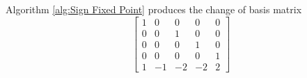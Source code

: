 \documentclass{article}
\theoremstyle{plain}
\theoremstyle{definition}
\newcommand{\tand}{\ensuremath{\,\,\, \text{and} \,\,\,}}
\begin{document}
Algorithm \ref{alg:Sign Fixed Point} produces the change of basis matrix 
$$
 \left[ \begin {array}{ccccc} 1&0&0&0&0\\ 0&0&1&0&0
\\ 0&0&0&1&0\\ 0&0&0&0&1
\\ 1&-1&-2&-2&2\end {array} \right]
$$
\end{document}
